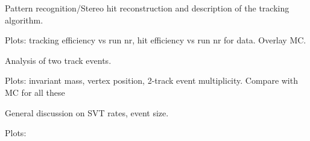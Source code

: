 \vspace{1cm}{\bf Tracking algorithms [Matt/Omar]}



Pattern recognition/Stereo hit reconstruction and description of the tracking algorithm. 

Plots: tracking efficiency vs run nr, hit efficiency vs run nr for data. Overlay MC.

\vspace{1cm}{\bf Two track events analysis [Matt]}

Analysis of two track events. 

Plots: invariant mass, vertex position, 2-track event multiplicity. Compare with MC for all these 


\vspace{1cm}{\bf SVT DAQ Performance [Pelle/Omar/Ryan]}
General discussion on SVT rates, event size.

Plots: 
